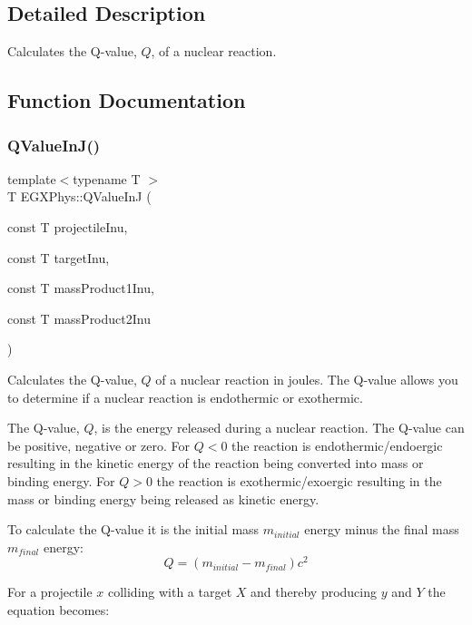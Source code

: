 \subsection{Detailed Description}
Calculates the Q-\/value, $Q$, of a nuclear reaction. 

\subsection{Function Documentation}
\mbox{\label{group___e_g_x_phys-_q_value_gaa61414574096631a36ff857b311c435c}} 
\subsubsection{\texorpdfstring{Q\+Value\+In\+J()}{QValueInJ()}}
{\footnotesize\ttfamily template$<$typename T $>$ \\
T E\+G\+X\+Phys\+::\+Q\+Value\+InJ (\begin{DoxyParamCaption}\item[{const T}]{projectile\+Inu,  }\item[{const T}]{target\+Inu,  }\item[{const T}]{mass\+Product1\+Inu,  }\item[{const T}]{mass\+Product2\+Inu }\end{DoxyParamCaption})}



Calculates the Q-\/value, $Q$ of a nuclear reaction in joules. The Q-\/value allows you to determine if a nuclear reaction is endothermic or exothermic. 

The Q-\/value, $Q$, is the energy released during a nuclear reaction. The Q-\/value can be positive, negative or zero. For $Q < 0$ the reaction is endothermic/endoergic resulting in the kinetic energy of the reaction being converted into mass or binding energy. For $Q > 0$ the reaction is exothermic/exoergic resulting in the mass or binding energy being released as kinetic energy.

To calculate the Q-\/value it is the initial mass $m_{initial}$ energy minus the final mass $m_{final}$ energy\+: \[Q = \left ( m_{initial}-m_{final}\right ) c^2\]

For a projectile $x$ colliding with a target $X$ and thereby producing $y$ and $Y$ the equation becomes\+:

